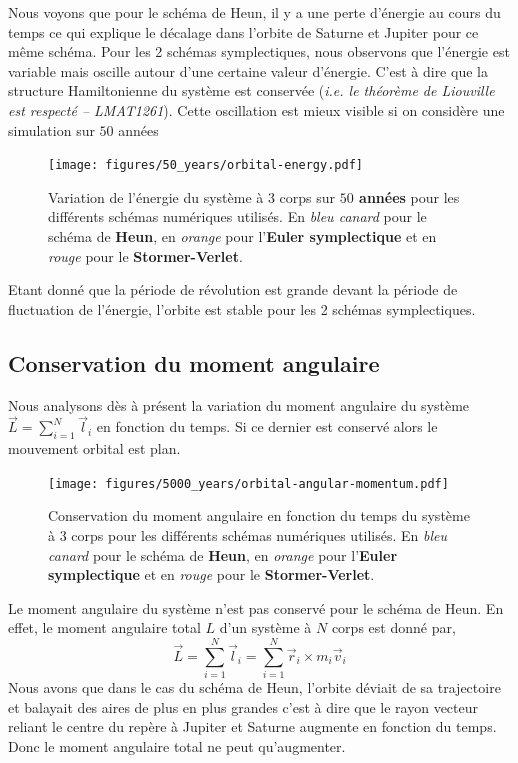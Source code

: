 \documentclass[11pt,twoside=semi,openright,numbers=noenddot]{article}
\begin{document}
Nous voyons que pour le schéma de Heun, il y a une perte d'énergie au cours du temps ce qui explique le décalage dans l'orbite de Saturne et Jupiter pour ce même schéma. Pour les 2 schémas symplectiques, nous observons que l'énergie est variable mais oscille autour d'une certaine valeur d'énergie. C'est à dire que la structure Hamiltonienne du système est conservée (\emph{i.e. le théorème de Liouville est respecté -- LMAT1261}). Cette oscillation est mieux visible si on considère une simulation sur $50$ années

\begin{figure}[H]
  \centering
  \texttt{[image: figures/50\_years/orbital-energy.pdf]}
  \caption{Variation de l'énergie du système à 3 corps sur \textbf{$50$ années} pour les différents schémas numériques utilisés. En \emph{bleu canard} pour le schéma de \textbf{Heun}, en \emph{orange} pour l'\textbf{Euler symplectique} et en \emph{rouge} pour le \textbf{Stormer-Verlet}.}
  \label{fig:orbital-energy--50}
\end{figure}


Etant donné que la période de révolution est grande devant la période de fluctuation de l'énergie, l'orbite est stable pour les 2 schémas symplectiques.

\subsection{Conservation du moment angulaire}
Nous analysons dès à présent la variation du moment angulaire du système $\vec{L} = \sum_{i=1}^{N} \vec{l}_i$ en fonction du temps. Si ce dernier est conservé alors le mouvement orbital est plan.

\begin{figure}[H]
    \centering
    \texttt{[image: figures/5000\_years/orbital-angular-momentum.pdf]}
    \caption{Conservation du moment angulaire en fonction du temps du système à 3 corps pour les différents schémas numériques utilisés. En \emph{bleu canard} pour le schéma de \textbf{Heun}, en \emph{orange} pour l'\textbf{Euler symplectique} et en \emph{rouge} pour le \textbf{Stormer-Verlet}.}
    \label{fig:orbital-angular-momentum}
\end{figure}

Le moment angulaire du système n'est pas conservé pour le schéma de Heun. En effet, le moment angulaire total $L$ d'un système à $N$ corps est donné par,
\begin{equation}
  \vec{L} = \sum_{i=1}^N \vec{l}_i = \sum_{i=1}^N \vec{r}_i \times m_i \vec{v}_i
\end{equation}
Nous avons que dans le cas du schéma de Heun, l'orbite déviait de sa trajectoire et balayait des aires de plus en plus grandes c'est à dire que le rayon vecteur reliant le centre du repère à Jupiter et Saturne augmente en fonction du temps. Donc le moment angulaire total ne peut qu'augmenter.
\end{document}
